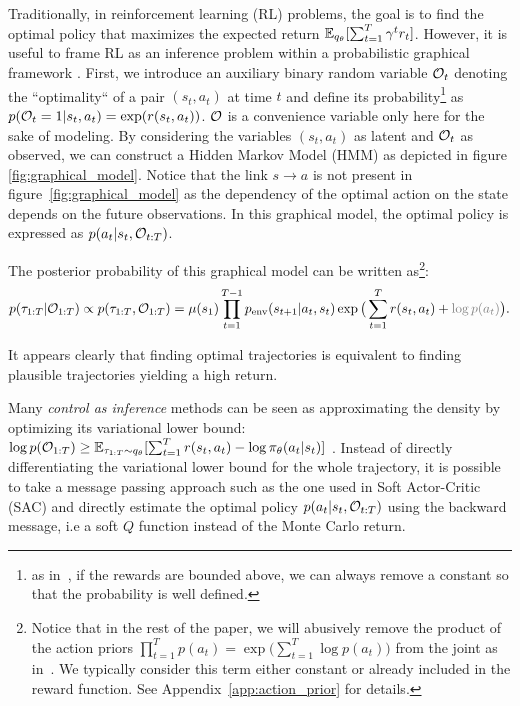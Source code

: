 Traditionally, in reinforcement learning (RL) problems, the goal is to find the optimal policy that maximizes the expected return $\mathbb{E}_{q_\theta}[\sum_{t=1}^T \gamma^t r_t]$. 
However, it is useful to frame RL as an inference problem within a probabilistic graphical framework \citep{rawlik2012stochastic, toussaint2006probabilistic, levine2018reinforcement}. First, we introduce an auxiliary binary random variable ${\mathcal{O}}_t$ denoting the ``optimality`` of a pair $(s_t, a_t)$ at time $t$ and define its probability\footnote{as in~\cite{levine2018reinforcement}, if the rewards are bounded above, we can always remove a constant so that the probability is well defined.} as $p({\mathcal{O}}_{t}=1|s_t, a_t) = \exp(r(s_t, a_t))$. ${\mathcal{O}}$ is a convenience variable only here for the sake of modeling. By considering the variables $(s_t, a_t)$ as latent and ${\mathcal{O}}_t$ as observed, we can construct a Hidden Markov Model (HMM) as depicted in figure \ref{fig:graphical_model}.
Notice that the link $s \rightarrow a$ is not present in figure~\ref{fig:graphical_model} as the dependency of the optimal action on the state depends on the future observations. In this graphical model, the optimal policy is expressed as $p(a_t | s_t, {\mathcal{O}}_{t:T})$.


The posterior probability of this graphical model can be written as\footnote{Notice that in the rest of the paper, we will abusively remove the product of the action priors $\prod_{t=1}^{T} p(a_t) = \exp\big(\sum_{t=1}^{T}\log p(a_t)\big)$ from the joint as in~\cite{levine2018reinforcement}. We typically consider this term either constant or already included in the reward function. See Appendix~\ref{app:action_prior} for details.}: 
\begin{equation}
\label{eq:posterior_target}
p(\traj_{1:T} | \gO_{1:T}) \propto p(\traj_{1:T}, \gO_{1:T}) = \mu(s_1) \prod_{t=1}^{T-1} \penv(s_{t+1}|a_t, s_t) \exp\big(\sum_{t=1}^{T} r(s_t, a_t) + \textcolor{gray}{\log p(a_t) } \big).
\end{equation}


It appears clearly that finding optimal trajectories is equivalent to finding plausible trajectories yielding a high return.



Many \textit{control as inference} methods can be seen as approximating the density by optimizing its variational lower bound: $\log p(\mathcal{O}_{1:T}) \geq \mathbb{E}_{\tau_{1:T}\sim q_\theta} [\sum_{t=1}^T r(s_t, a_t) - \log \pi_\theta(a_t|s_t) ]$  \citep{rawlik2012stochastic, toussaint2009robot}. Instead of directly differentiating the variational lower bound for the whole trajectory, it is possible to take a message passing approach such as the one used in Soft Actor-Critic (SAC) \citep{haarnoja2018soft} and directly estimate the optimal policy $p(a_t | s_t, {\mathcal{O}}_{t:T})$ using the backward message, i.e a soft $Q$ function instead of the Monte Carlo return.


